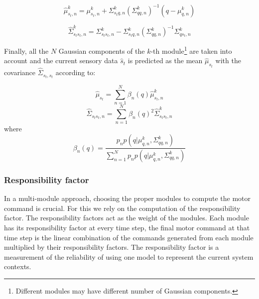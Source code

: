 \documentclass[preprint,12pt]{elsarticle}
\begin{document}
\begin{equation}
{
\hat{\mu}_{s_t,n}^k = {\mu}_{s_t,n}^k + \Sigma_{{s_t}q,n}^k({\Sigma}_{qq,n}^k)^{-1}(q-{\mu}_{q,n}^k)
}
\end{equation}

\begin{equation}
{
\hat{\Sigma}_{{s_t}{s_t},n}^k = {\Sigma}_{{s_t}{s_t},n}^k - {\Sigma}_{{s_t}q,n}^k({\Sigma}_{qq,n}^k)^{-1}{\Sigma}_{q{s_t},n}^k
}
\end{equation}


Finally, all the $N$ Gaussian components of the $k$-th module\footnote{Different modules may have different number of Gaussian components.} are taken into account and the current sensory data $\hat{s}_t$ is predicted as the mean $\hat{\mu}_{s_t}$ with the covariance $\hat{\Sigma}_{s_t,s_t}$ according to:

\begin{equation}
{
\hat{\mu}_{s_t} = \sum_{n=1}^N{\beta_n(q)}\hat{\mu}_{s_t,n}^k
}
\end{equation}
\begin{equation}
{
\hat{\Sigma}_{{s_t}{s_t},n} = \sum_{n=1}^N{\beta_n(q)}^2\hat{\Sigma}_{{s_t}{s_t},n}^k
}
\end{equation}
where
\begin{equation}
{
\beta_n(q) = \frac{p_{n}p(q|{\mu}_{q,n}^k,{\Sigma}_{qq,n}^k)}
{\sum_{n=1}^N{p_n}p(q|{\mu}_{q,n}^k,{\Sigma}_{qq,n}^k)}
}
\end{equation}



\subsubsection{Responsibility factor}
\label{sec:rf}

In a multi-module approach, choosing the proper modules to compute the motor command is crucial. For this we rely on the computation of the responsibility factor. The responsibility factors act as the weight of the modules. Each module has its responsibility factor at every time step, the final motor command at that time step is the linear combination of the commands generated from each module multiplied by their responsibility factors.
The responsibility factor is a measurement of the reliability of using one model to represent the current system contexts.
%
%
\end{document}
